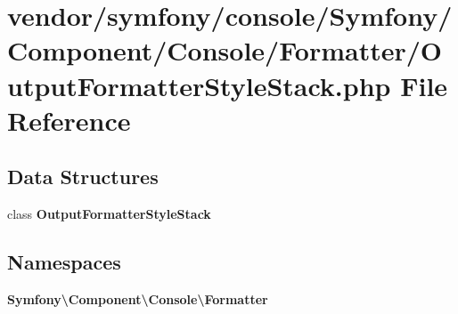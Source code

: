 \section{vendor/symfony/console/\+Symfony/\+Component/\+Console/\+Formatter/\+Output\+Formatter\+Style\+Stack.php File Reference}
\label{_output_formatter_style_stack_8php}
\subsection*{Data Structures}
\begin{DoxyCompactItemize}
\item 
class {\bf Output\+Formatter\+Style\+Stack}
\end{DoxyCompactItemize}
\subsection*{Namespaces}
\begin{DoxyCompactItemize}
\item 
 {\bf Symfony\textbackslash{}\+Component\textbackslash{}\+Console\textbackslash{}\+Formatter}
\end{DoxyCompactItemize}
